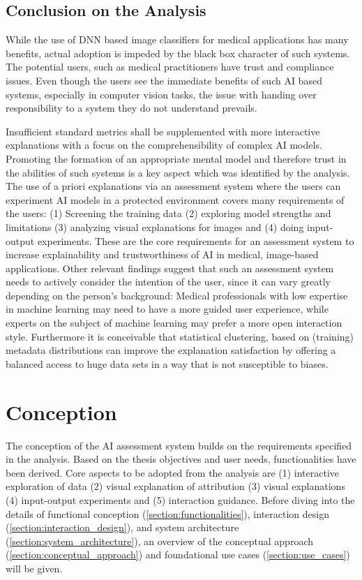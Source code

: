 \documentclass[11pt,a4paper,english]{scrreprt}
\begin{document}
\section{Conclusion on the Analysis}
While the use of DNN based image classifiers for medical applications has many benefits, actual adoption is impeded by the black box character of such systems. The potential users, such as medical practitioners have trust and compliance issues. Even though the users see the immediate benefits of such AI based systems, especially in computer vision tasks, the issue with handing over responsibility to a system they do not understand prevails.

Insufficient standard metrics shall be supplemented with more interactive explanations with a focus on the comprehensibility of complex AI models. Promoting the formation of an appropriate mental model and therefore trust in the abilities of such systems is a key aspect which was identified by the analysis. The use of a priori explanations via an assessment system where the users can experiment AI models in a protected environment covers many requirements of the users: (1) Screening the training data (2) exploring model strengths and limitations (3) analyzing visual explanations for images and (4) doing input-output experiments. These are the core requirements for an assessment system to increase explainability and trustworthiness of AI in medical, image-based applications. Other relevant findings suggest that such an assessment system needs to actively consider the intention of the user, since it can vary greatly depending on the person's background: Medical professionals with low expertise in machine learning may need to have a more guided user experience, while experts on the subject of machine learning may prefer a more open interaction style. Furthermore it is conceivable that statistical clustering, based on (training) metadata distributions can improve the explanation satisfaction by offering a balanced access to huge data sets in a way that is not susceptible to biases.

\newpage
\chapter{Conception}\label{chapter:conception}
The conception of the AI assessment system builds on the requirements specified in the analysis. Based on the thesis objectives and user needs, functionalities have been derived. Core aspects to be adopted from the analysis are (1) interactive exploration of data (2) visual explanation of attribution (3) visual explanations (4) input-output experiments and (5) interaction guidance. Before diving into the details of functional conception (\autoref{section:functionalities}), interaction design (\autoref{section:interaction_design}), and system architecture (\autoref{section:system_architecture}), an overview of the conceptual approach (\autoref{section:conceptual_approach}) and foundational use cases (\autoref{section:use_cases}) will be given.
\end{document}
